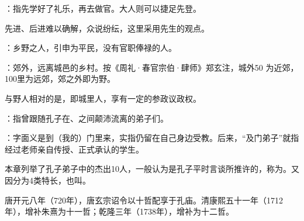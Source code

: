 {
\item {}：指先学好了礼乐，再去做官。大人则可以捷足先登。

先进、后进难以确解，众说纷纭，这里采用先生的观点。

\item {}：乡野之人，引申为平民，没有官职俸禄的人。

：郊外，远离城邑的乡村。按《周礼·春官宗伯·肆师》郑玄注，城外50 为近郊，100里为远郊，郊之外即为野。

与野人相对的是，即城里人，享有一定的参政议政权。
}
{}


{
\item {}：指曾跟随孔子在、之间颠沛流离的弟子们。%
\item {}：字面义是到（我的）门里来，实指仍留在自己身边受教。后来，“及门弟子”就指经过老师亲自传授、正式承认的学生。
}
{}


{
本章列举了孔子弟子中的杰出10人，一般认为是孔子平时言谈所推许的，称为。又因分为4类特长，也叫。

唐开元八年（720年），唐玄宗诏令以十哲配享于孔庙。清康熙五十一年（1712年），增补朱熹为十一哲；乾隆三年（1738年），增补为十二哲。

}
{
}  %


